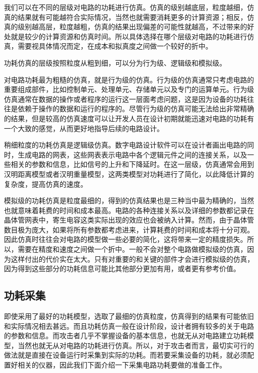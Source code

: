 我们可以在不同的层级对电路的功耗进行仿真。仿真的级别越底层，粒度越细，仿真的结果就有可能越符合实际情况，当然也就需要消耗更多的计算资源；相反，仿真的级别越高层，粒度越粗，仿真的结果出现偏差的可能性就越高，不过带来的好处就是较少的计算资源和仿真时间。所以具体选择在哪个层级对电路的功耗进行仿真，需要视具体情况而定，在成本和拟真度之间做一个较好的折中。

功耗仿真的层级按照粒度从粗到细，可以分为行为级、逻辑级和模拟级。

对电路功耗最为粗糙的仿真，就是行为级的仿真。行为级的仿真通常只考虑电路的重要组成部件，比如控制单元、处理单元、存储单元以及专门的运算单元。行为级仿真通常在数据的操作或者程序的运行这一层面考虑问题，这是因为设备的功耗往往是依赖于操作的数据和运行的程序的。尽管行为级的仿真可能无法给出非常精确的结果，但是较高的仿真速度可以让开发人员在设计初期就能迅速对电路的功耗有一个大致的感觉，从而更好地指导后续的电路设计。

稍细粒度的功耗仿真是逻辑级仿真。数字电路设计软件可以在设计者画出电路的同时，生成电路的网表，这些网表表示电路中各个逻辑元件之间的连接关系，以及一些相关的参数和信息，比如信号的上升和下降延时。在这一层级，仿真通常会用到汉明距离模型或者汉明重量模型，这两类模型对功耗进行了简化，以此降低计算的复杂度，提高仿真的速度。

模拟级的功耗仿真是粒度最细的，得到的仿真结果也是三种当中最为精确的，当然也就意味着耗费的时间和成本最高。电路的各种连接关系以及详细的参数都记录在晶体管网表中，寄生电容这类实际出现的效应也会被纳入计算。然而，由于晶体管数目极为庞大，如果将所有参数都考虑进来，计算耗费的时间和成本将十分可观。因此仿真时往往会对电路的模型做一些必要的简化，这将带来一定的精度损失。所以，需要在精度和速度之间做一个折中。一般不会对整个电路做模拟级的仿真，因为这样付出的代价实在太大。只有对重要的和关键的部件才会进行模拟级的仿真，因为得到这些部分的功耗信息可能比其他部分更加有用，或者更有参考价值。

\subsection{功耗采集} %
\label{sec:collect}
即使采用了最好的功耗模型，选取了最细的仿真粒度，仿真得到的结果有可能依旧和实际情况相去甚远。而且功耗仿真一般在设计阶段，设计者拥有较多的关于电路的参数和信息。而攻击者几乎不掌握设备的基本信息，也就无从对电路建立功耗模型，当然也就无从对电路的功耗进行仿真。所以，对于攻击者而言，最切实可行的做法就是直接在设备运行时采集到实际的功耗。而若要采集设备的功耗，就必须配置好相关的仪器，因此我们下面介绍一下采集电路功耗要做的准备工作。

\vspace*{0.5\baselineskip}

